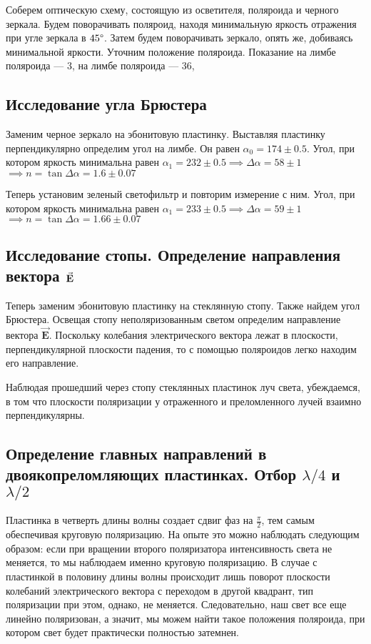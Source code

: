 \documentclass[a4paper,12pt]{article}
\begin{document}
		Соберем оптическую схему, состоящую из осветителя, поляроида и черного зеркала.	Будем поворачивать поляроид, находя минимальную яркость отражения при угле зеркала в $45\degree$.
		Затем будем поворачивать зеркало, опять же, добиваясь минимальной
		яркости. Уточним положение поляроида. Показание на лимбе поляроида  --- 3\degree, на лимбе поляроида   --- 36\degree,
		
		\subsection{Исследование угла Брюстера}
		
		Заменим черное зеркало на эбонитовую пластинку. Выставляя пластинку перпендикулярно определим угол на лимбе. Он равен $\alpha_0 = 174\pm0.5$\degree. Угол, при котором яркость минимальна равен  $\alpha_1 = 232\pm0.5$\degree $\implies\Delta\alpha = 58\pm1$\degree $\implies n = \tan\Delta\alpha = 1.6\pm 0.07$
		
		Теперь установим зеленый светофильтр и повторим измерение с ним. 
		Угол, при котором яркость минимальна равен  $\alpha_1 = 233\pm0.5$\degree $\implies\Delta\alpha = 59\pm1$\degree $\implies n = \tan\Delta\alpha = 1.66\pm 0.07$
		
		\subsection{Исследование стопы. Определение направления вектора $\vec{\bf{E}}$}
		
			Теперь заменим эбонитовую пластинку на стеклянную стопу. Также найдем угол Брюстера. Освещая стопу неполяризованным светом определим направление вектора $\vec{\mathbf{E}}$. Поскольку колебания электрического вектора лежат в плоскости, перпендикулярной плоскости падения, то с помощью поляроидов легко находим его направление. 
		
		Наблюдая прошедший через стопу стеклянных пластинок луч света,
			убеждаемся, в том что плоскости поляризации у отраженного
			и преломленного лучей взаимно перпендикулярны. 
	
		\subsection{Определение главных направлений в двоякопреломляющих пластинках. Отбор $\lambda/4$ и $\lambda/2$}
		Пластинка в четверть длины волны создает сдвиг фаз на $\frac{\pi}{2}$, тем самым обеспечивая круговую поляризацию. На опыте это можно наблюдать следующим образом: если при вращении второго поляризатора интенсивность света не меняется, то мы наблюдаем именно круговую поляризацию. В случае с пластинкой в половину длины волны происходит лишь поворот плоскости колебаний электрического вектора с переходом в другой квадрант, тип поляризации при этом, однако, не меняется. Следовательно, наш свет все еще линейно поляризован, а значит, мы можем найти такое положения поляроида, при котором свет будет практически полностью затемнен.
		
\end{document}

